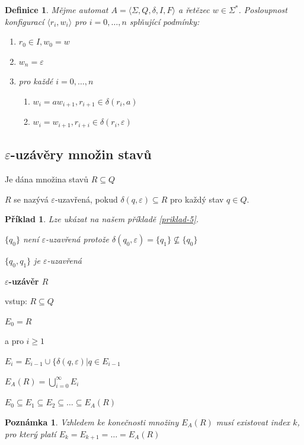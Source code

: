 \documentclass[10pt, a4paper, titlepage]{article}
\theoremstyle{note}
\newtheorem{definice}{Definice}
\newtheorem{priklad}{Příklad}
\newtheorem{poznamka}{Poznámka}
\begin{document}
\begin{definice}
Mějme automat $A = \langle \Sigma,Q,\delta,I,F \rangle$ a řetězec $w \in \Sigma^*$. Posloupnost konfigurací $\langle r_i,w_i \rangle$ pro $i=0,\ldots,n$ splňující podmínky:
\begin{enumerate}
\item
$r_{0} \in I, w_0=w$
\item
$w_{n} = \varepsilon$
\item
pro každé $i=0,\ldots,n$
\begin{enumerate}
\item
$w_i = aw_{i+1}, r_{i+1} \in \delta(r_i,a)$
\item
$w_i=w_{i+1} , r_{i+i} \in \delta(r_i,\varepsilon)$
\end{enumerate}
\end{enumerate}

\end{definice}

\subsection{$\varepsilon$-uzávěry množin stavů}

Je dána množina stavů $R \subseteq Q$

$R$ se nazývá $\varepsilon$-uzavřená, pokud $ \delta (q,\varepsilon) \subseteq R$ pro každý stav $ q \in Q$.

\begin{priklad}
Lze ukázat na našem příkladě \ref{priklad-5}.

$\lbrace q_0 \rbrace $ není $\varepsilon$-uzavřená protože $\delta(q_0,\varepsilon) = \lbrace q_1 \rbrace \nsubseteq \lbrace q_0 \rbrace$

$\lbrace q_0,q_1 \rbrace$ je $\varepsilon$-uzavřená
\end{priklad}

\textbf{$\varepsilon$-uzávěr $R$}

vstup: $R \subseteq Q$

\quad$E_0=R$

a pro $i \geq 1$

\quad$E_i=E_{i-1} \cup \lbrace \delta (q,\varepsilon) | q \in E_{i-1}$

\quad$E_A(R)=\bigcup_{i=0}^\infty E_i$

\quad$E_0 \subseteq E_1 \subseteq E_2 \subseteq \ldots \subseteq E_A(R)$

\begin{poznamka}
Vzhledem ke konečnosti množiny $E_A(R)$ musí existovat index $k$, pro který platí $E_k = E_{k+1} = \ldots = E_A(R)$
\end{poznamka}
\end{document}
